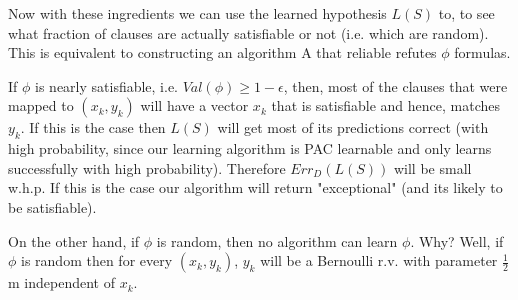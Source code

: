 \documentclass[12pt]{report}
\begin{document}
Now with these ingredients we can use the learned hypothesis $L(S)$ to, to see what fraction of clauses are actually satisfiable or not (i.e. which are random). This is equivalent to constructing an algorithm A that reliable refutes $\phi$ formulas.

If $\phi$ is nearly satisfiable, i.e. $Val(\phi) \geq 1 - \epsilon$, then, most of the clauses that were mapped to $(x_k, y_k)$ will have a vector $x_k$ that is satisfiable and hence, matches $y_k$. If this is the case then $L(S)$ will get most of its predictions correct (with high probability, since our learning algorithm is PAC learnable and only learns successfully with high probability). Therefore $ Err_{D}(L(S)) $ will be small w.h.p. If this is the case our algorithm will return "exceptional" (and its likely to be satisfiable).

On the other hand, if $\phi$ is random, then no algorithm can learn $\phi$. Why? Well, if $\phi$ is random then for every $(x_k, y_k)$, $y_k$ will be a Bernoulli r.v. with parameter $\frac{1}{2}$ m independent of $x_k$.
\end{document}
